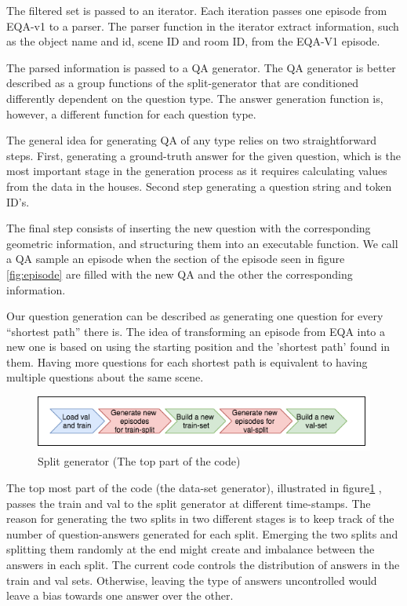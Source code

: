 The filtered set is passed to an iterator. Each iteration passes one episode from EQA-v1 to a parser. The parser function in the iterator extract information, such as the object name and id, scene ID and room ID, from the EQA-V1 episode. 

The parsed information is passed to a QA generator. The QA generator is better described  as a group functions of the split-generator that are conditioned differently dependent on the question type. The answer generation function is, however, a different function for each question type.  

 The general idea for generating QA of any type relies on two straightforward steps. First, generating a ground-truth answer for the given question, which is the most important stage in the generation process as it requires calculating values from the data in the houses. Second step generating a question string and token ID's.

The  final step consists of inserting the new question with the corresponding geometric information, and structuring them into an executable function.  We call a QA sample an episode when the section of the episode seen in figure \ref{fig:episode} are filled with the new QA and the other the corresponding information. 

Our question generation can be described as generating one question for every “shortest path” there is. The idea of transforming  an episode from EQA into a new one is based on using the starting position and the 'shortest path' found in them. Having more questions for each shortest path is equivalent to having multiple questions about the same scene. 

\begin{figure}[H]
\includegraphics[scale=0.5]{images/stages.png}
\caption{Split generator (The top part of the code)}
\label{fig:stages}
\end{figure}


The top most part of the code (the data-set generator), illustrated in figure\ref{fig:stages} , passes the train and val to the split generator at different time-stamps. The reason for generating the two splits in two different stages is to keep track of the number of question-answers generated for each split. Emerging the two splits and splitting them randomly at the end might create and imbalance between the  answers in each split. The current code controls the distribution of answers in the train and val sets. Otherwise, leaving the type of answers uncontrolled would leave a bias towards one answer over the other. 

